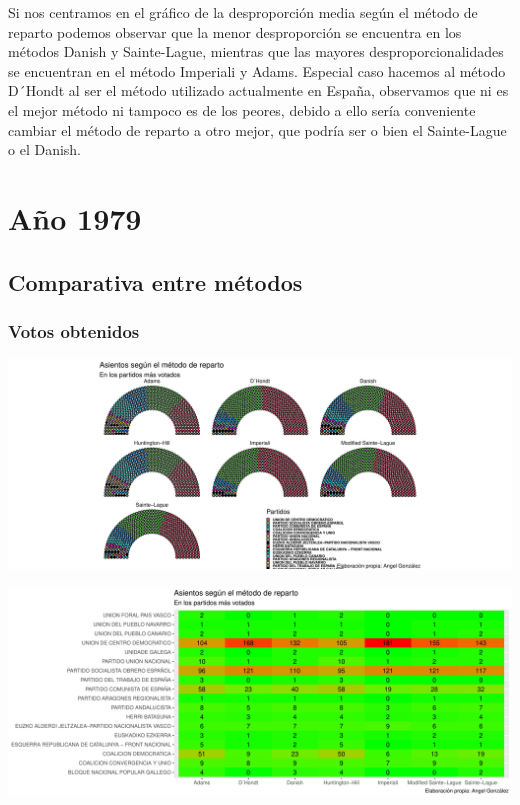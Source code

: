\documentclass[12pt,a4paper,]{book}
\numberwithin{dummy}{section}
\theoremstyle{ocrenumbox}
\theoremstyle{blacknumex}
\theoremstyle{blacknumbox}
\theoremstyle{ocrenum}
\theoremstyle{ocrenum}
\begin{document}
Si nos centramos en el gráfico de la desproporción media según el método
de reparto podemos observar que la menor desproporción se encuentra en
los métodos Danish y Sainte-Lague, mientras que las mayores
desproporcionalidades se encuentran en el método Imperiali y Adams.
Especial caso hacemos al método D´Hondt al ser el método utilizado
actualmente en España, observamos que ni es el mejor método ni tampoco
es de los peores, debido a ello sería conveniente cambiar el método de
reparto a otro mejor, que podría ser o bien el Sainte-Lague o el Danish.

\hypertarget{auxf1o-1979}{%
\section{Año 1979}\label{auxf1o-1979}}

\hypertarget{comparativa-entre-muxe9todos-1}{%
\subsection{Comparativa entre
métodos}\label{comparativa-entre-muxe9todos-1}}

\hypertarget{votos-obtenidos-1}{%
\subsubsection{Votos obtenidos}\label{votos-obtenidos-1}}

\begin{center}\includegraphics[width=0.95\linewidth]{figurasR/unnamed-chunk-71-1} \end{center}

\begin{center}\includegraphics[width=0.95\linewidth]{figurasR/unnamed-chunk-71-2} \end{center}
\end{document}
